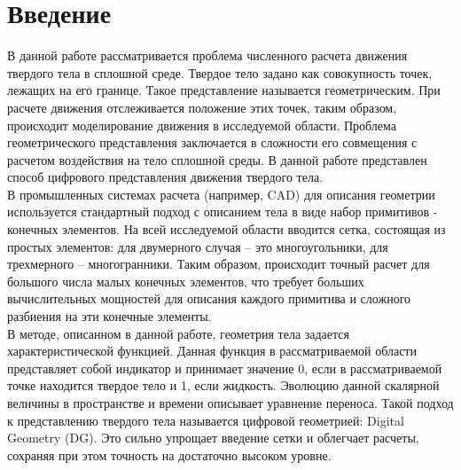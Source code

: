 \documentclass[12pt,a4paper]{article}
\begin{document}
\newpage
\tableofcontents


\newpage

\section{Введение}
В данной работе рассматривается проблема численного расчета движения твердого тела в сплошной среде. Твердое тело задано как совокупность точек, лежащих на его границе. Такое представление называется геометрическим. При расчете движения отслеживается положение этих точек, таким образом, происходит моделирование движения в исследуемой области. Проблема геометрического представления заключается в сложности его совмещения с расчетом воздействия на тело сплошной среды. В данной работе представлен способ цифрового представления движения твердого тела.\\
В промышленных системах расчета (например, CAD) для описания геометрии используется стандартный подход с описанием тела в виде набор примитивов - конечных элементов. На всей исследуемой области вводится сетка, состоящая из простых элементов: для двумерного случая – это многоугольники, для трехмерного – многогранники. Таким образом, происходит точный расчет для большого числа малых конечных элементов, что требует больших вычислительных мощностей для описания каждого примитива и сложного разбиения на эти конечные элементы.\\
В методе, описанном в данной работе, геометрия тела задается характеристической функцией. Данная функция в рассматриваемой области представляет собой индикатор и принимает значение 0, если в рассматриваемой точке находится твердое тело и 1, если жидкость. Эволюцию данной скалярной величины в пространстве и времени описывает уравнение переноса. Такой подход к представлению твердого тела называется цифровой геометрией: Digital Geometry (DG). Это сильно упрощает введение сетки и облегчает расчеты, сохраняя при этом точность на достаточно высоком уровне.\\
\end{document}
